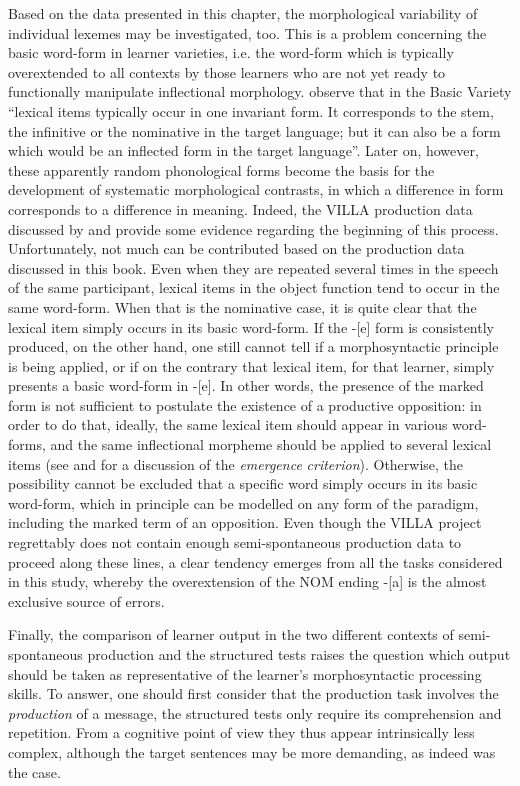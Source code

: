 Based on the data presented in this chapter, the morphological variability of individual lexemes may be investigated, too. This is a problem concerning the basic word-form in learner varieties, i.e. the word-form which is typically overextended to all contexts by those learners who are not yet ready to functionally manipulate inflectional morphology. \citet[311]{KleinPerdue1997} observe that in the Basic Variety “lexical items typically occur in one invariant form. It corresponds to the stem, the infinitive or the nominative in the target language; but it can also be a form which would be an inflected form in the target language”. Later on, however, these apparently random phonological forms become the basis for the development of systematic morphological contrasts, in which a difference in form corresponds to a difference in meaning. Indeed, the VILLA production data discussed by \citet{Bernini2018} and \citet[28--33]{Dimroth2018} provide some evidence regarding the beginning of this process. Unfortunately, not much can be contributed based on the production data discussed in this book. Even when they are repeated several times in the speech of the same participant, lexical items in the object function tend to occur in the same word-form. When that is the nominative case, it is quite clear that the lexical item simply occurs in its basic word-form. If the -[e] form is consistently produced, on the other hand, one still cannot tell if a morphosyntactic principle is being applied, or if on the contrary that lexical item, for that learner, simply presents a basic word-form in -[e]. In other  words, the presence of the marked form is not sufficient to postulate the existence of a productive opposition: in order to do that, ideally, the same lexical item should appear in various word-forms, and the same inflectional morpheme should be applied to several lexical items (see \citealt{Pienemann1998} and \citealt{Pallotti2007} for a discussion of the \textit{emergence} \textit{criterion}). Otherwise, the possibility cannot be excluded that a specific word simply occurs in its basic word-form, which in principle can be modelled on any form of the paradigm, including the marked term of an opposition. Even though the VILLA project regrettably does not contain enough semi-spontaneous production data to proceed along these lines, a clear tendency emerges from all the tasks considered in this study, whereby the overextension of the NOM ending -[a] is the almost exclusive source of errors.

Finally, the comparison of learner output in the two different contexts of semi-spontaneous  production and the structured tests raises the question which output should be taken as representative of the learner's morphosyntactic processing skills. To answer, one should first consider that the production task involves the \textit{production} of a message, the structured tests only require its comprehension and repetition. From a cognitive point of view they thus appear intrinsically less complex, although the target sentences may be more demanding, as indeed was the case. 


